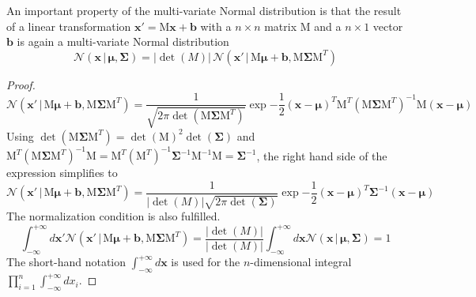 \documentclass{tstextbook}
\begin{document}
\begin{theorem}
  \label{th:multivariatenormaldistributionunderlineartransformation}
An important property of the multi-variate Normal distribution is that the result of a linear transformation $\mathbf{x}'=\mathrm{M}\mathbf{x}+\mathbf{b}$ with a $n\times n$ matrix $\mathrm{M}$ and a $n\times 1$ vector $\mathbf{b}$ is again a multi-variate Normal distribution   
  \begin{equation}
  \mathcal{N}\left(\mathbf{x}\,\vert\,\boldsymbol{\mu},\boldsymbol{\Sigma}\right)=
  \vert\det(M)\vert\,\mathcal{N}\left(\mathbf{x}'\,\vert\,\mathrm{M}\boldsymbol{\mu}+\mathbf{b},\mathrm{M}\boldsymbol{\Sigma}\mathrm{M}^T\right)
  \end{equation}
\end{theorem}
\begin{proof}
  \begin{equation}
\mathcal{N}\left(\mathbf{x}'\,\vert\,\mathrm{M}\boldsymbol{\mu}+\mathbf{b},\mathrm{M}\boldsymbol{\Sigma}\mathrm{M}^T\right)=
 \frac{1}{\sqrt{2\pi \det\left(\mathrm{M}\boldsymbol{\Sigma}\mathrm{M}^T\right)}}\exp{-\frac{1}{2}(\mathbf{x}-\boldsymbol{\mu})^T\mathrm{M}^T\left(\mathrm{M}\boldsymbol{\Sigma}\mathrm{M}^T\right)^{-1}\mathrm{M}(\mathbf{x}-\boldsymbol{\mu})}
 \end{equation}
 Using $\det\left(\mathrm{M}\boldsymbol{\Sigma}\mathrm{M}^T\right)=\det(\mathrm{M})^2 \det(\boldsymbol{\Sigma})$ and $\mathrm{M}^T\left(\mathrm{M}\boldsymbol{\Sigma}\mathrm{M}^T\right)^{-1}\mathrm{M} = \mathrm{M}^T(\mathrm{M}^T)^{-1}\boldsymbol{\Sigma}^{-1}\mathrm{M}^{-1}\mathrm{M}=\boldsymbol{\Sigma}^{-1}$, the right hand side of the expression simplifies to
  \begin{equation}
\mathcal{N}\left(\mathbf{x}'\,\vert\,\mathrm{M}\boldsymbol{\mu}+\mathbf{b},\mathrm{M}\boldsymbol{\Sigma}\mathrm{M}^T\right)=
 \frac{1}{\vert\det(M)\vert\sqrt{2\pi \det\left(\boldsymbol{\Sigma}\right)}}\exp{-\frac{1}{2}(\mathbf{x}-\boldsymbol{\mu})^T\boldsymbol{\Sigma}^{-1}(\mathbf{x}-\boldsymbol{\mu})}
 \end{equation}
 The normalization condition is also fulfilled.
   \begin{equation}
\int_{-\infty}^{+\infty}d\mathbf{x}'\mathcal{N}\left(\mathbf{x}'\,\vert\,\mathrm{M}\boldsymbol{\mu}+\mathbf{b},\mathrm{M}\boldsymbol{\Sigma}\mathrm{M}^T\right)=
 \frac{\vert\det(M)\vert}{\vert\det(M)\vert}\int_{-\infty}^{+\infty}d\mathbf{x}\mathcal{N}\left(\mathbf{x}\,\vert\,\boldsymbol{\mu},\boldsymbol{\Sigma}\right)=1
 \end{equation}
 The short-hand notation $\int_{-\infty}^{+\infty}d\mathbf{x}$ is used for the $n$-dimensional integral $\prod_{i=1}^n\int_{-\infty}^{+\infty}dx_i$.
 \end{proof}
\end{document}
